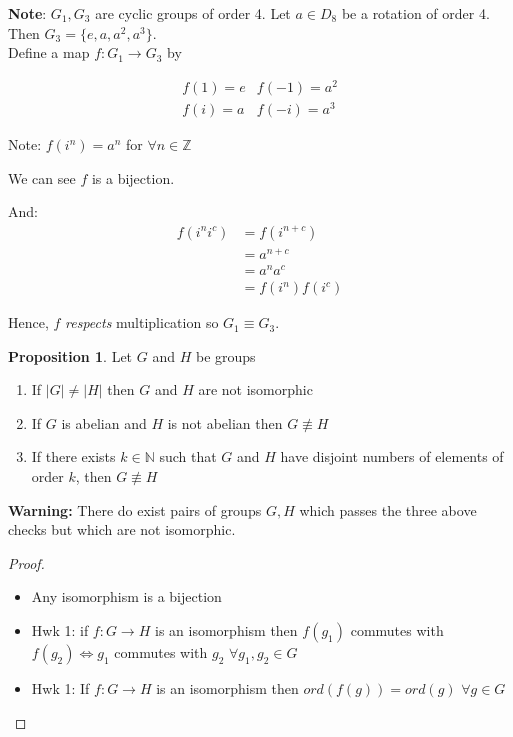 \documentclass{article}
\theoremstyle{definition}
\newtheorem{proposition}{Proposition}
\begin{document}
\textbf{Note}: $G_1, G_3$ are cyclic groups of order 4. Let $a \in D_8$ be a rotation of order 4. 
Then $G_3 = \{e,a,a^2, a^3\}$.\hfill\\

Define a map $f:G_1 \rightarrow G_3$ by 

\begin{equation*}
  \begin{matrix}
    f(1)=e & f(-1) = a^2 \\
    f(i)=a & f(-i) = a^3
  \end{matrix}
  \label{}
\end{equation*}

Note: $f(i^n) = a^n$ for $\forall n \in \mathbb{Z}$

We can see $f$ is a bijection.

And: 
\begin{align*}
  f(i^ni^c) &= f(i^{n+c})\\
  &= a^{n+c} \\
  &= a^n a^c \\
  &= f(i^n)f(i^c)
\end{align*}

Hence, $f$ \emph{respects} multiplication so $G_1 \equiv G_3.$

\begin{proposition}
  Let $G$ and $H$ be groups 
  \begin{enumerate}
    \item If $|G| \neq |H|$ then $G$ and $H$ are not isomorphic
    \item If $G$ is abelian and $H$ is not abelian then $G \not\equiv H$
    \item If there exists $k \in \mathbb{N}$ such that $G$ and $H$ have disjoint numbers of elements of order $k$, then $G \not\equiv H$
  \end{enumerate}
\end{proposition}

\textbf{Warning:} There do exist pairs of groups $G, H$ which passes the three above checks but which are not isomorphic.

\begin{proof}
  \begin{itemize}
    \item Any isomorphism is a bijection
    \item Hwk 1: 
      if $f : G \rightarrow H$ is an isomorphism then $f(g_1)$ commutes with $f(g_2) \iff g_1$ commutes with $g_2$ $\forall g_1,g_2 \in G$
    \item Hwk 1: 
      If $f:G\rightarrow H$ is an isomorphism then $ord(f(g))=ord(g)$ $\forall g\in G$
  \end{itemize}
\end{proof}
\end{document}
